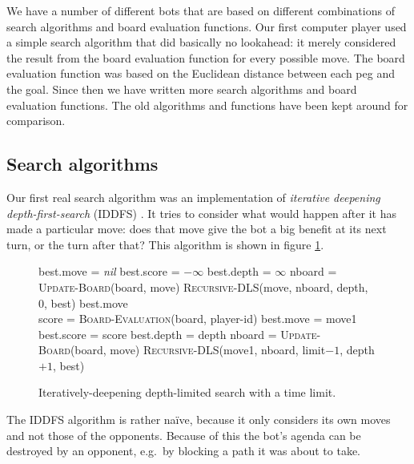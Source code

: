 We have a number of different bots that are based on different
combinations of search algorithms and board evaluation functions. Our
first computer player used a simple search algorithm that did
basically no lookahead: it merely considered the result from the board
evaluation function for every possible move. The board evaluation
function was based on the Euclidean distance between each peg and the
goal. Since then we have written more search algorithms and board
evaluation functions. The old algorithms and functions have been kept
around for comparison.

\subsection{Search algorithms}

Our first real search algorithm was an implementation of
\emph{iterative deepening depth-first-search} (IDDFS) \cite{aimodern}.
It tries to consider what would happen after it has made a particular
move: does that move give the bot a big benefit at its next turn, or
the turn after that? This algorithm is shown in figure \ref{iddfs}.

\begin{figure}
\begin{algorithmic}
\State best.move = \emph{nil}
\State best.score = $-\infty$
\State best.depth = $\infty$
  \State nboard = \textsc{Update-Board}(board, move)
  \State \textsc{Recursive-DLS}(move, nboard, depth, 0, best)
 \EndFor
  \State \Return best.move
 \EndIf
\EndFor
\EndFunction
\\
\State score = \textsc{Board-Evaluation}(board, player-id)
\State best.move = move1
\State best.score = score
\State best.depth = depth
\EndIf
{}
\State \Return
\EndIf
{}
 \State nboard = \textsc{Update-Board}(board, move)
 \State \textsc{Recursive-DLS}(move1, nboard, limit$-1$, depth$+1$, best)
\EndFor
\EndFunction
\end{algorithmic}
\caption{Iteratively-deepening depth-limited search with a time limit.}
\label{iddfs}
\end{figure}

The IDDFS algorithm is rather na\"ive, because it only considers its
own moves and not those of the opponents. Because of this the bot's
agenda can be destroyed by an opponent, e.g.~by blocking a path it was
about to take.

